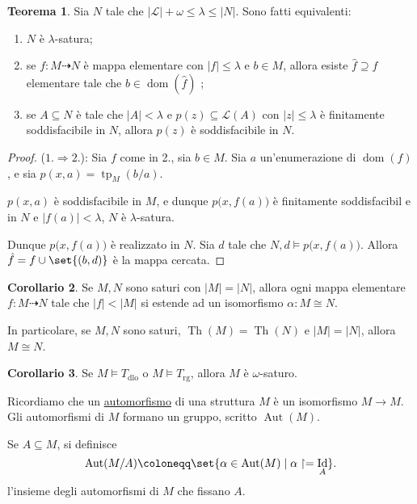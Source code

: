 \documentclass[10pt]{article}
\DeclareMathOperator{\Id}{Id}
\newcommand{\card}[1]{\left\vert #1 \right\vert}
\newcommand{\1}{\mathds{1}}
\newcommand{\partialto}{\dashrightarrow}
\theoremstyle{definition}%
\newtheorem{thm}{Teorema}[section]
\newtheorem{cor}[thm]{Corollario}
\theoremstyle{plain}
\theoremstyle{remark}
\newcommand{\Tdlo}{T_{\text{dlo}}}
\newcommand{\Trg}{T_{\text{rg}}}
\begin{document}
\begin{thm}
Sia \(N\) tale che \(\card{\mathcal{L}}+\omega\le\lambda\le\card{N}\). Sono fatti equivalenti:
\begin{enumerate}
\item \(N\) è \(\lambda\)-satura;
\item se \(f:M\partialto N\) è mappa elementare con \(\card{f}\le \lambda\) e \(b \in M\), allora esiste \(\hat{f}\supseteq f\) elementare tale che \(b \in \operatorname{dom}(\hat{f})\) ;
\item se \(A \subseteq N\) è tale che \(\card{A}<\lambda\) e \(p(z) \subseteq \mathcal{L}(A)\) con \(\card{z}\le\lambda\) è finitamente soddisfacibile in \(N\), allora \(p(z)\) è soddisfacibile in \(N\).
\end{enumerate}
\end{thm}
\begin{proof}
(\(1. \Rightarrow 2.\)): Sia \(f\) come in 2., sia \(b \in M\). Sia \(a\) un'enumerazione di \(\operatorname{dom}(f)\), e sia \(p(x,a)=\operatorname{tp}_{M}(b/a)\).

\(p(x,a)\) è soddisfacibile in \(M\), e dunque \(p\big(x,f(a)\big)\) è finitamente soddisfacibil e in \(N\) e \(\card{f(a)}<\lambda\), \(N\) è \(\lambda\)-satura.

Dunque \(p\big(x,f(a)\big)\) è realizzato in \(N\). Sia \(d\) tale che \(N,d\vDash p\big(x,f(a)\big)\). Allora \(\hat{f}=f\cup\set{(b,d)}\) è la mappa cercata.
\end{proof}

\begin{cor}
Se \(M,N\) sono saturi con \(\card{M}=\card{N}\), allora ogni mappa elementare \(f:M\partialto N\) tale che \(\card{f}<\card{M}\) si estende ad un isomorfismo \(\alpha:M\cong N\).

In particolare, se \(M,N\) sono saturi, \(\operatorname{Th}(M)=\operatorname{Th}(N)\) e \(\card{M}=\card{N}\), allora \(M\cong N\).
\end{cor}
\begin{cor}
Se \(M\vDash \Tdlo\) o \(M\vDash \Trg\), allora \(M\) è \(\omega\)-saturo.
\end{cor}

Ricordiamo che un \uline{automorfismo} di una struttura \(M\) è un isomorfismo \(M\to M\). Gli automorfismi di \(M\) formano un gruppo, scritto \(\operatorname{Aut}(M)\).

Se \(A \subseteq M\), si definisce
\begin{equation*}
\operatorname{Aut}(M/A) \coloneqq\set{\alpha \in \operatorname{Aut}(M) \mid \alpha\upharpoonright=\Id_{A}}.
\end{equation*}
l'insieme degli automorfismi di \(M\) che fissano \(A\).
\end{document}
